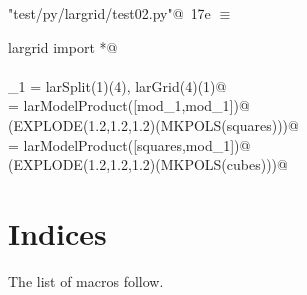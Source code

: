 \documentclass[11pt,oneside]{article}	%
\begin{document}
\begin{flushleft} \small \label{scrap30}
\protect{}\verb@"test/py/largrid/test02.py"@\nobreak\ {\footnotesize 17e }$\equiv$
\vspace{-1ex}
\begin{list}{}{} \item
\mbox{}\verb@from largrid import *@\\
\mbox{}\verb@@\\
\mbox{}\verb@mod_1 = larSplit(1)(4), larGrid(4)(1)@\\
\mbox{}\verb@squares = larModelProduct([mod_1,mod_1])@\\
\mbox{}\verb@VIEW(EXPLODE(1.2,1.2,1.2)(MKPOLS(squares)))@\\
\mbox{}\verb@cubes = larModelProduct([squares,mod_1])@\\
\mbox{}\verb@VIEW(EXPLODE(1.2,1.2,1.2)(MKPOLS(cubes)))@\\
\mbox{}\verb@@{\NWsep}
\end{list}
\vspace{-2ex}
\end{flushleft}


\section{Indices}
\label{sec:indices}

The list of macros follow.
\end{document}
